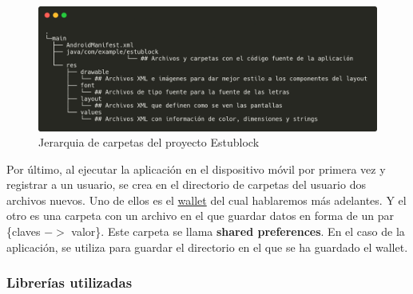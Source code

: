 \begin{figure}[h!]
  \centering
  \includegraphics[width=0.9\linewidth]{figs/Desarrollo/JerarquiaCarpetas}
  \caption[Jerarquia Estublock]{Jerarquia de carpetas del proyecto Estublock}
  \label{fig:jerarquia_estublock}
\end{figure}

Por último, al ejecutar la aplicación en el dispositivo móvil por primera vez y registrar a un usuario, se crea en el directorio de carpetas del usuario dos archivos nuevos. Uno de ellos es el \hyperref[sec:wallet]{wallet} del cual hablaremos más adelantes. Y el otro es una carpeta con un archivo en el que guardar datos en forma de un par \{claves $->$ valor\}. Este carpeta se llama \textbf{shared preferences}. En el caso de la aplicación, se utiliza para guardar el directorio en el que se ha guardado el wallet.

\subsubsection{Librerías utilizadas} \label{sec:librerias}

